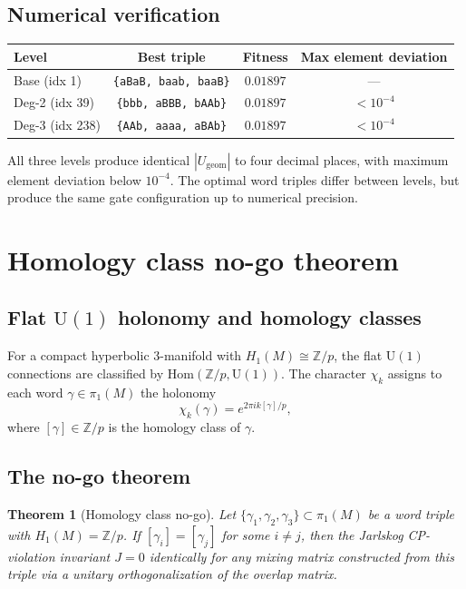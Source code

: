 \documentclass[12pt]{article}
\newtheorem{theorem}{Theorem}
\theoremstyle{definition}
\begin{document}
\subsection{Numerical verification}

\begin{center}
\begin{tabular}{lccc}
\toprule
Level & Best triple & Fitness & Max element deviation \\
\midrule
Base (idx 1) &
  \texttt{\{aBaB, baab, baaB\}} & $0.01897$ & --- \\
Deg-2 (idx 39) &
  \texttt{\{bbb, aBBB, bAAb\}} & $0.01897$ & $< 10^{-4}$ \\
Deg-3 (idx 238) &
  \texttt{\{AAb, aaaa, aBAb\}} & $0.01897$ & $< 10^{-4}$ \\
\bottomrule
\end{tabular}
\end{center}

All three levels produce identical $|U_\mathrm{geom}|$ to four
decimal places, with maximum element deviation below $10^{-4}$.
The optimal word triples differ between levels, but produce the
same gate configuration up to numerical precision.

\section{Homology class no-go theorem}
\label{sec:nogo}

\subsection{Flat $\mathrm{U}(1)$ holonomy and homology classes}

For a compact hyperbolic 3-manifold with $H_1(M) \cong \mathbb{Z}/p$,
the flat $\mathrm{U}(1)$ connections are classified by
$\mathrm{Hom}(\mathbb{Z}/p, \mathrm{U}(1))$. The character
$\chi_k$ assigns to each word $\gamma \in \pi_1(M)$ the holonomy
\[
  \chi_k(\gamma) = e^{2\pi i k [\gamma]/p},
\]
where $[\gamma] \in \mathbb{Z}/p$ is the homology class of $\gamma$.

\subsection{The no-go theorem}

\begin{theorem}[Homology class no-go]
\label{thm:nogo}
Let $\{\gamma_1, \gamma_2, \gamma_3\} \subset \pi_1(M)$ be a
word triple with $H_1(M) = \mathbb{Z}/p$. If
$[\gamma_i] = [\gamma_j]$ for some $i \neq j$, then the
Jarlskog CP-violation invariant $J = 0$ identically for any
mixing matrix constructed from this triple via a unitary
orthogonalization of the overlap matrix.
\end{theorem}
\end{document}
